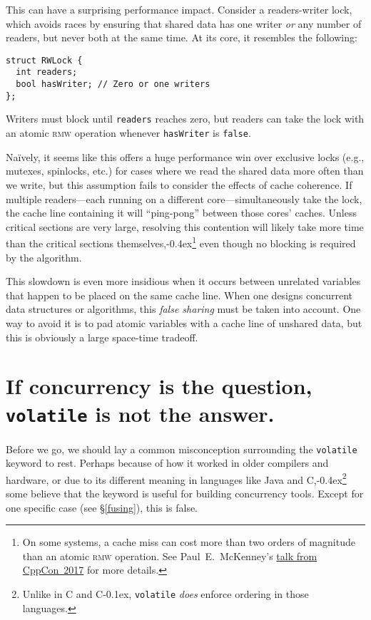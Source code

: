 \documentclass[fontsize=\bodyfontsize, numbers=endperiod]{scrartcl}
\newcommand{\codesize}{\fontsize{\bodyfontsize}{\bodybaselineskip}}
\newcommand{\punckern}{\kern-0.4ex}
\newcommand{\monobox}[1]{\mbox{\texttt{#1}}}
\newcommand{\keyword}[1]{\monobox{\color{darkGreen}#1}}
\newcommand{\cpp}[1]{C\kern-0.1ex\raisebox{0.15ex}{\texttt{++}}{\addfontfeature{Numbers=LowercaseOff}#1}}
\newcommand{\clang}[1]{C{\addfontfeature{Numbers=LowercaseOff}#1}}
\newcommand{\csharp}{C\raisebox{0.25ex}{\#}}
\newcommand{\introduce}[1]{\textit{#1}}
\newcommand{\secref}[1]{\hyperref[#1]{\textsc{\S}\ref*{#1}}}
\newenvironment{colfigure}
  {\par\vspace{1\baselineskip minus 0.5\baselineskip}\noindent\minipage{\linewidth}}
  {\endminipage\vspace{1\baselineskip minus 0.7\baselineskip}}
\begin{document}
\begin{multicols}{2}
This can have a surprising performance impact.
Consider a readers-writer lock,
which avoids races by ensuring that shared data has one writer \emph{or}
any number of readers, but never both at the same time.
At its core, it resembles the following:
\begin{colfigure}
\begin{verbatim}
struct RWLock {
  int readers;
  bool hasWriter; // Zero or one writers
};
\end{verbatim}
\end{colfigure}
Writers must block until \texttt{readers} reaches zero, but
readers can take the lock
with an atomic \textsc{rmw} operation
whenever \texttt{hasWriter} is \texttt{false}.

Naïvely, it seems like this offers a huge performance win over exclusive
locks (e.g., mutexes, spinlocks, etc.) for cases where we read the shared data
more often than we write,
but this assumption fails to consider the effects of cache coherence.
If multiple readers---each running on a different core---simultaneously
take the lock,
the cache line containing it will ``ping-pong'' between those cores' caches.
Unless critical sections are very large, resolving this contention will likely
take more time than the critical sections
themselves,\punckern\footnote{On some systems, a cache miss can cost more than
two orders of magnitude than an atomic \textsc{rmw} operation.
See Paul~E.\ McKenney's
\href{https://www.youtube.com/watch?v=74QjNwYAJ7M}{talk from CppCon~2017}
for more details.}
even though no blocking is required by the algorithm.

This slowdown is even more insidious when it occurs between unrelated variables
that happen to be placed on the same cache line.
When one designs concurrent data structures or algorithms,
this \introduce{false sharing} must be taken into account.
One way to avoid it is to pad atomic variables with a cache line of
unshared data, but this is obviously a large space-time tradeoff.

\section{If concurrency is the question, \texttt{volatile} is not the answer.}

Before we go, we should lay a common misconception surrounding
the \keyword{volatile} keyword to rest.
Perhaps because of how it worked in older compilers and hardware,
or due to its different meaning in languages like
Java and \csharp,\punckern\footnote{Unlike in \clang{} and \cpp{},
\keyword{volatile} \emph{does} enforce ordering in those languages.}
some believe that the keyword is useful for building concurrency tools.
Except for one specific case (see \secref{fusing}), this is false.


\end{multicols}
\end{document}
